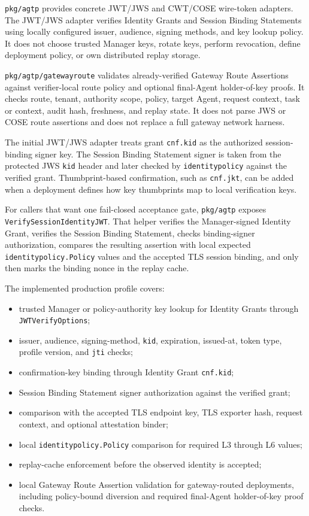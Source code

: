 \documentclass[
]{article}
\providecommand{\tightlist}{%
  \setlength{\itemsep}{0pt}\setlength{\parskip}{0pt}}
\begin{document}
\texttt{pkg/agtp} provides concrete JWT/JWS and CWT/COSE wire-token
adapters. The JWT/JWS adapter verifies Identity Grants and Session
Binding Statements using locally configured issuer, audience, signing
methods, and key lookup policy. It does not choose trusted Manager keys,
rotate keys, perform revocation, define deployment policy, or own
distributed replay storage.

\texttt{pkg/agtp/gatewayroute} validates already-verified Gateway Route
Assertions against verifier-local route policy and optional final-Agent
holder-of-key proofs. It checks route, tenant, authority scope, policy,
target Agent, request context, task or context, audit hash, freshness,
and replay state. It does not parse JWS or COSE route assertions and
does not replace a full gateway network harness.

The initial JWT/JWS adapter treats grant \texttt{cnf.kid} as the
authorized session-binding signer key. The Session Binding Statement
signer is taken from the protected JWS \texttt{kid} header and later
checked by \texttt{identitypolicy} against the verified grant.
Thumbprint-based confirmation, such as \texttt{cnf.jkt}, can be added
when a deployment defines how key thumbprints map to local verification
keys.

For callers that want one fail-closed acceptance gate, \texttt{pkg/agtp}
exposes \texttt{VerifySessionIdentityJWT}. That helper verifies the
Manager-signed Identity Grant, verifies the Session Binding Statement,
checks binding-signer authorization, compares the resulting assertion
with local expected \texttt{identitypolicy.Policy} values and the
accepted TLS session binding, and only then marks the binding nonce in
the replay cache.

The implemented production profile covers:

\begin{itemize}
\tightlist
\item
  trusted Manager or policy-authority key lookup for Identity Grants
  through \texttt{JWTVerifyOptions};
\item
  issuer, audience, signing-method, \texttt{kid}, expiration, issued-at,
  token type, profile version, and \texttt{jti} checks;
\item
  confirmation-key binding through Identity Grant \texttt{cnf.kid};
\item
  Session Binding Statement signer authorization against the verified
  grant;
\item
  comparison with the accepted TLS endpoint key, TLS exporter hash,
  request context, and optional attestation binder;
\item
  local \texttt{identitypolicy.Policy} comparison for required L3
  through L6 values;
\item
  replay-cache enforcement before the observed identity is accepted;
\item
  local Gateway Route Assertion validation for gateway-routed
  deployments, including policy-bound diversion and required final-Agent
  holder-of-key proof checks.
\end{itemize}
\end{document}
